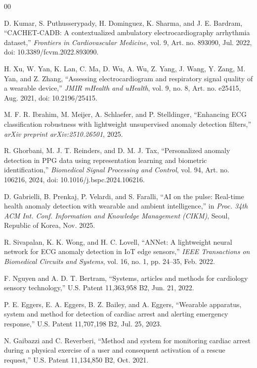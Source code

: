 \documentclass{ieeeaccess}
\begin{document}
\begin{thebibliography}{00}

D. Kumar, S. Puthusserypady, H. Dominguez, K. Sharma, and J. E. Bardram, ``CACHET-CADB: A contextualized ambulatory electrocardiography arrhythmia dataset,'' \textit{Frontiers in Cardiovascular Medicine}, vol. 9, Art. no. 893090, Jul. 2022, doi: 10.3389/fcvm.2022.893090.

H. Xu, W. Yan, K. Lan, C. Ma, D. Wu, A. Wu, Z. Yang, J. Wang, Y. Zang, M. Yan, and Z. Zhang, ``Assessing electrocardiogram and respiratory signal quality of a wearable device,'' \textit{JMIR mHealth and uHealth}, vol. 9, no. 8, Art. no. e25415, Aug. 2021, doi: 10.2196/25415.

M. F. R. Ibrahim, M. Meijer, A. Schlaefer, and P. Stelldinger, ``Enhancing ECG classification robustness with lightweight unsupervised anomaly detection filters,'' \textit{arXiv preprint arXiv:2510.26501}, 2025.

R. Ghorbani, M. J. T. Reinders, and D. M. J. Tax, ``Personalized anomaly detection in PPG data using representation learning and biometric identification,'' \textit{Biomedical Signal Processing and Control}, vol. 94, Art. no. 106216, 2024, doi: 10.1016/j.bspc.2024.106216.

D. Gabrielli, B. Prenkaj, P. Velardi, and S. Faralli, ``AI on the pulse: Real-time health anomaly detection with wearable and ambient intelligence,'' in \textit{Proc. 34th ACM Int. Conf. Information and Knowledge Management (CIKM)}, Seoul, Republic of Korea, Nov. 2025.

R. Sivapalan, K. K. Wong, and H. C. Lovell, ``ANNet: A lightweight neural network for ECG anomaly detection in IoT edge sensors,'' \textit{IEEE Transactions on Biomedical Circuits and Systems}, vol. 16, no. 1, pp. 24--35, Feb. 2022.

F. Nguyen and A. D. T. Bertram, ``Systems, articles and methods for cardiology sensory technology,'' U.S. Patent 11,363,958 B2, Jun. 21, 2022.

P. E. Eggers, E. A. Eggers, B. Z. Bailey, and A. Eggers, ``Wearable apparatus, system and method for detection of cardiac arrest and alerting emergency response,'' U.S. Patent 11,707,198 B2, Jul. 25, 2023.

N. Gaibazzi and C. Reverberi, ``Method and system for monitoring cardiac arrest during a physical exercise of a user and consequent activation of a rescue request,'' U.S. Patent 11,134,850 B2, Oct. 2021.


\end{thebibliography}
\end{document}
